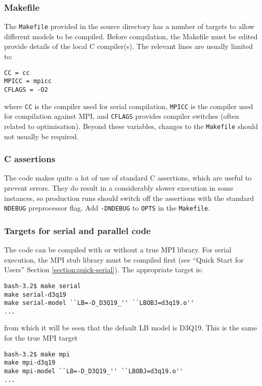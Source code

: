 \subsubsection{Makefile}

The \texttt{Makefile} provided in the source directory has a number of
targets to allow different models to be compiled. Before compilation,
the Makefile must be edited provide details of the local C compiler(s).
The relevant lines are usually limited to:
\begin{lstlisting}
CC = cc
MPICC = mpicc
CFLAGS = -O2
\end{lstlisting}
where \texttt{CC} is the compiler used for serial compilation,
\texttt{MPICC} is the compiler used for compilation against
MPI, and \texttt{CFLAGS} provides compiler switches (often
related to optimisation). Beyond these variables, changes to
the \texttt{Makefile} should not usually be required.

\subsubsection{C assertions}

The code makes quite a lot of use of standard C assertions, which
are useful to prevent errors. They do result in a considerably
slower execution in some instances, so production runs should
switch off the assertions with the standard \texttt{NDEBUG}
preprocessor flag. Add \texttt{-DNDEBUG} to \texttt{OPTS} in
the \texttt{Makefile}.

\subsubsection{Targets for serial and parallel code}

The code can be compiled with or without a true MPI library.
For serial execution, the MPI stub library must be compiled
first (see ``Quick Start for Users'' Section \ref{section:quick-serial}).
The appropriate target is:
\begin{lstlisting}
bash-3.2$ make serial
make serial-d3q19
make serial-model ``LB=-D_D3Q19_'' ``LBOBJ=d3q19.o''
...
\end{lstlisting}
from which it will be seen that the default LB model is D3Q19. This is
the same for the true MPI target
\begin{lstlisting}
bash-3.2$ make mpi
make mpi-d3q19
make mpi-model ``LB=-D_D3Q19_'' ``LBOBJ=d3q19.o''
...
\end{lstlisting}

